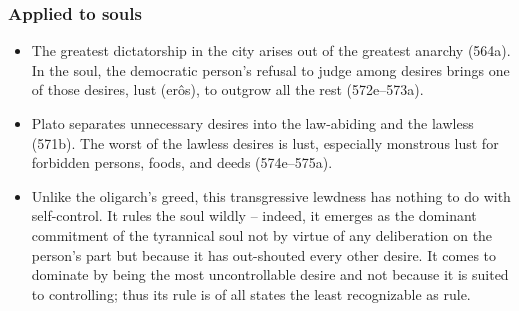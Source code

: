 \documentclass[oneside]{article}
\begin{document}
\subsubsection*{Applied to souls} 

\begin{itemize}
\item The greatest dictatorship in the city arises out of the
greatest anarchy (564a). In the soul, the democratic person's refusal to
judge among desires brings one of those desires, lust (erôs), to outgrow
all the rest (572e--573a). 
\item Plato separates unnecessary desires into
the law-abiding and the lawless (571b). The worst of the lawless desires
is lust, especially monstrous lust for forbidden persons, foods, and
deeds (574e--575a). 
\item Unlike the oligarch's greed, this transgressive
lewdness has nothing to do with self-control. It rules the soul wildly
-- indeed, it emerges as the dominant commitment of the tyrannical soul
not by virtue of any deliberation on the person's part but because it
has out-shouted every other desire. It comes to dominate by being the
most uncontrollable desire and not because it is suited to controlling;
thus its rule is of all states the least recognizable as rule.
\end{itemize}
\end{document}
